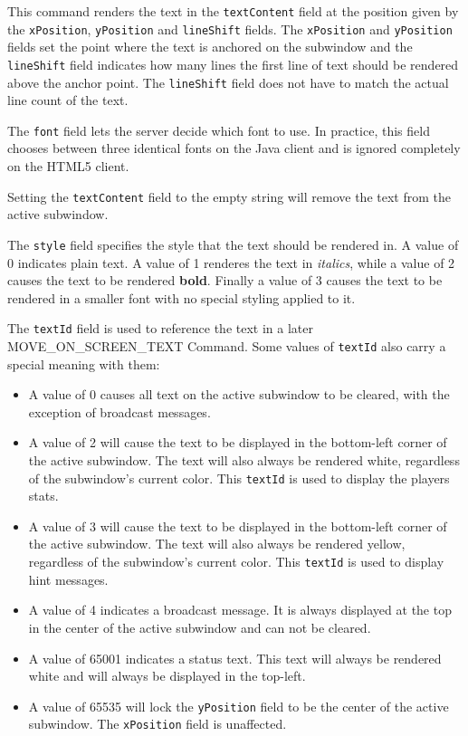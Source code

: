 \documentclass{article}
\newcommand{\field}[1]{\textcolor{fieldColor}{\texttt{#1}}}
\begin{document}
This command renders the text in the \field{textContent} field at the position given by the \field{xPosition}, \field{yPosition} and \field{lineShift} fields. The \field{xPosition} and \field{yPosition}
fields set the point where the text is anchored on the subwindow and the \field{lineShift} field indicates how many lines the first line of text should be rendered above the anchor point. The \field{lineShift}
field does not have to match the actual line count of the text.

The \field{font} field lets the server decide which font to use. In practice, this field chooses between three identical fonts on the Java client and is ignored completely on the HTML5 client.

Setting the \field{textContent} field to the empty string will remove the text from the active subwindow.

The \field{style} field specifies the style that the text should be rendered in. A value of 0 indicates plain text. A value of 1 renderes the text in \textit{italics}, while a value of 2 causes the text to
be rendered \textbf{bold}. Finally a value of 3 causes the text to be rendered in a smaller font with no special styling applied to it.

The \field{textId} field is used to reference the text in a later \\
MOVE\_ON\_SCREEN\_TEXT Command. Some values of \field{textId} also carry a special meaning with them:
\begin{itemize}
\item A value of 0 causes all text on the active subwindow to be cleared, with the exception of broadcast messages.
\item A value of 2 will cause the text to be displayed in the bottom-left corner of the active subwindow. The text will also always be rendered white, regardless of the subwindow's current color. 
This \field{textId} is used to display the players stats.
\item A value of 3 will cause the text to be displayed in the bottom-left corner of the active subwindow. The text will also always be rendered yellow, regardless of the subwindow's current color.
This \field{textId} is used to display hint messages.
\item A value of 4 indicates a broadcast message. It is always displayed at the top in the center of the active subwindow and can not be cleared.
\item A value of 65001 indicates a status text. This text will always be rendered white and will always be displayed in the top-left.
\item A value of 65535 will lock the \field{yPosition} field to be the center of the active subwindow. The \field{xPosition} field is unaffected.
\end{itemize}
\end{document}
